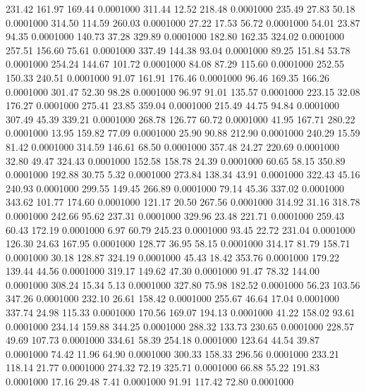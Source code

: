  231.42  161.97  169.44   0.0001000
 311.44   12.52  218.48   0.0001000
 235.49   27.83   50.18   0.0001000
 314.50  114.59  260.03   0.0001000
  27.22   17.53   56.72   0.0001000
  54.01   23.87   94.35   0.0001000
 140.73   37.28  329.89   0.0001000
 182.80  162.35  324.02   0.0001000
 257.51  156.60   75.61   0.0001000
 337.49  144.38   93.04   0.0001000
  89.25  151.84   53.78   0.0001000
 254.24  144.67  101.72   0.0001000
  84.08   87.29  115.60   0.0001000
 252.55  150.33  240.51   0.0001000
  91.07  161.91  176.46   0.0001000
  96.46  169.35  166.26   0.0001000
 301.47   52.30   98.28   0.0001000
  96.97   91.01  135.57   0.0001000
 223.15   32.08  176.27   0.0001000
 275.41   23.85  359.04   0.0001000
 215.49   44.75   94.84   0.0001000
 307.49   45.39  339.21   0.0001000
 268.78  126.77   60.72   0.0001000
  41.95  167.71  280.22   0.0001000
  13.95  159.82   77.09   0.0001000
  25.90   90.88  212.90   0.0001000
 240.29   15.59   81.42   0.0001000
 314.59  146.61   68.50   0.0001000
 357.48   24.27  220.69   0.0001000
  32.80   49.47  324.43   0.0001000
 152.58  158.78   24.39   0.0001000
  60.65   58.15  350.89   0.0001000
 192.88   30.75    5.32   0.0001000
 273.84  138.34   43.91   0.0001000
 322.43   45.16  240.93   0.0001000
 299.55  149.45  266.89   0.0001000
  79.14   45.36  337.02   0.0001000
 343.62  101.77  174.60   0.0001000
 121.17   20.50  267.56   0.0001000
 314.92   31.16  318.78   0.0001000
 242.66   95.62  237.31   0.0001000
 329.96   23.48  221.71   0.0001000
 259.43   60.43  172.19   0.0001000
   6.97   60.79  245.23   0.0001000
  93.45   22.72  231.04   0.0001000
 126.30   24.63  167.95   0.0001000
 128.77   36.95   58.15   0.0001000
 314.17   81.79  158.71   0.0001000
  30.18  128.87  324.19   0.0001000
  45.43   18.42  353.76   0.0001000
 179.22  139.44   44.56   0.0001000
 319.17  149.62   47.30   0.0001000
  91.47   78.32  144.00   0.0001000
 308.24   15.34    5.13   0.0001000
 327.80   75.98  182.52   0.0001000
  56.23  103.56  347.26   0.0001000
 232.10   26.61  158.42   0.0001000
 255.67   46.64   17.04   0.0001000
 337.74   24.98  115.33   0.0001000
 170.56  169.07  194.13   0.0001000
  41.22  158.02   93.61   0.0001000
 234.14  159.88  344.25   0.0001000
 288.32  133.73  230.65   0.0001000
 228.57   49.69  107.73   0.0001000
 334.61   58.39  254.18   0.0001000
 123.64   44.54   39.87   0.0001000
  74.42   11.96   64.90   0.0001000
 300.33  158.33  296.56   0.0001000
 233.21  118.14   21.77   0.0001000
 274.32   72.19  325.71   0.0001000
  66.88   55.22  191.83   0.0001000
  17.16   29.48    7.41   0.0001000
  91.91  117.42   72.80   0.0001000
